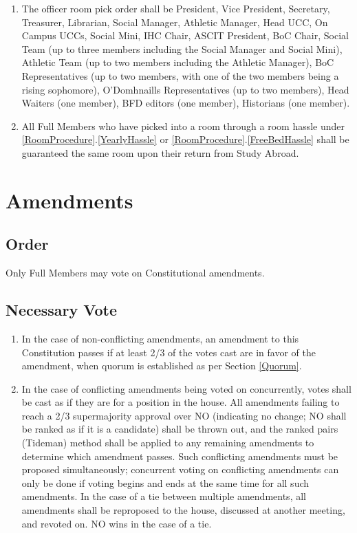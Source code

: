 \documentclass[10pt]{article} %
\begin{document}
\begin{enumerate}
\begin{enumerate}
\end{enumerate}
\item \label{OfficerRoomOrder}The officer room pick order shall be President, Vice President, Secretary, Treasurer, Librarian, Social Manager, Athletic Manager, Head UCC, On Campus UCCs, Social Mini, IHC Chair, ASCIT President, BoC Chair, Social Team (up to three members including the Social Manager and Social Mini), Athletic Team (up to two members including the Athletic Manager), BoC Representatives (up to two members, with one of the two members being a rising sophomore), O'Domhnaills Representatives (up to two members), Head Waiters (one member), BFD editors (one member), Historians (one member).
\item All Full Members who have picked into a room through a room hassle under \ref{RoomProcedure}.\ref{YearlyHassle} or \ref{RoomProcedure}.\ref{FreeBedHassle} shall be guaranteed the same room upon their return from Study Abroad.
\end{enumerate}
\section{Amendments}
\subsection{Order}
Only Full Members may vote on Constitutional amendments.
\subsection{Necessary Vote}
\begin{enumerate}
\item In the case of non-conflicting amendments, an amendment to this Constitution passes if at least 2/3 of the votes cast are in favor of the amendment, when quorum is established as per Section \ref{Quorum}.
\item In the case of conflicting amendments being voted on concurrently, votes shall be cast as if they are for a position in the house. All amendments failing to reach a 2/3 supermajority approval over NO (indicating no change; NO shall be ranked as if it is a candidate) shall be thrown out, and the ranked pairs (Tideman) method shall be applied to any remaining amendments to determine which amendment passes. Such conflicting amendments must be proposed simultaneously; concurrent voting on conflicting amendments can only be done if voting begins and ends at the same time for all such amendments. In the case of a tie between multiple amendments, all amendments shall be reproposed to the house, discussed at another meeting, and revoted on. NO wins in the case of a tie.
\end{enumerate}
\end{document}
